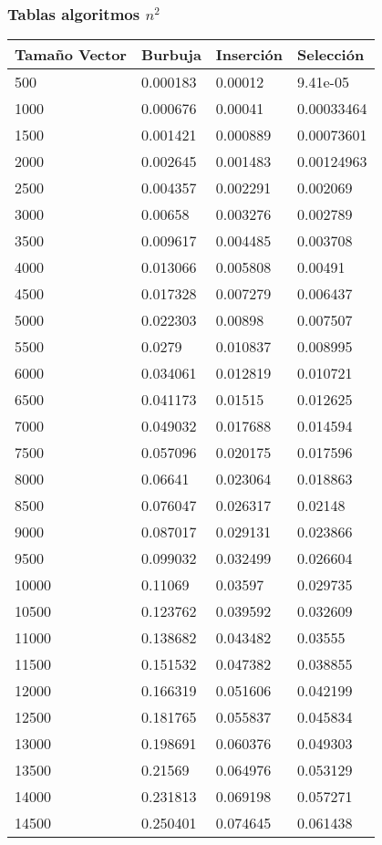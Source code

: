 \documentclass[a4paper, 11pt]{article}
\begin{document}
\subsubsection{ Tablas algoritmos $n^2$}
\begin{tabular}{@{}llll@{}}
\toprule
Tamaño Vector & Burbuja  & Inserción & Selección  \\ \midrule
500           & 0.000183 & 0.00012   & 9.41e-05   \\
1000          & 0.000676 & 0.00041   & 0.00033464 \\
1500          & 0.001421 & 0.000889  & 0.00073601 \\
2000          & 0.002645 & 0.001483  & 0.00124963 \\
2500          & 0.004357 & 0.002291  & 0.002069   \\
3000          & 0.00658  & 0.003276  & 0.002789   \\
3500          & 0.009617 & 0.004485  & 0.003708   \\
4000          & 0.013066 & 0.005808  & 0.00491    \\
4500          & 0.017328 & 0.007279  & 0.006437   \\
5000          & 0.022303 & 0.00898   & 0.007507   \\
5500          & 0.0279   & 0.010837  & 0.008995   \\
6000          & 0.034061 & 0.012819  & 0.010721   \\
6500          & 0.041173 & 0.01515   & 0.012625   \\
7000          & 0.049032 & 0.017688  & 0.014594   \\
7500          & 0.057096 & 0.020175  & 0.017596   \\
8000          & 0.06641  & 0.023064  & 0.018863   \\
8500          & 0.076047 & 0.026317  & 0.02148    \\
9000          & 0.087017 & 0.029131  & 0.023866   \\
9500          & 0.099032 & 0.032499  & 0.026604   \\
10000         & 0.11069  & 0.03597   & 0.029735   \\
10500         & 0.123762 & 0.039592  & 0.032609   \\
11000         & 0.138682 & 0.043482  & 0.03555    \\
11500         & 0.151532 & 0.047382  & 0.038855   \\
12000         & 0.166319 & 0.051606  & 0.042199   \\
12500         & 0.181765 & 0.055837  & 0.045834   \\
13000         & 0.198691 & 0.060376  & 0.049303   \\
13500         & 0.21569  & 0.064976  & 0.053129   \\
14000         & 0.231813 & 0.069198  & 0.057271   \\
14500         & 0.250401 & 0.074645  & 0.061438   \\


\end{tabular}
\end{document}
